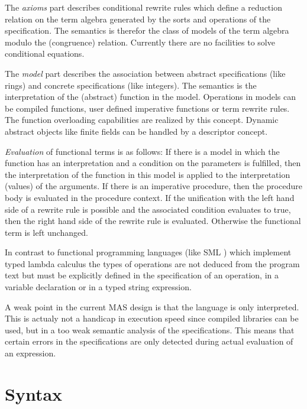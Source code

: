The {\em axioms} part describes conditional rewrite rules  
which define a reduction relation on the term algebra generated 
by the sorts and operations of the specification. 
The semantics is therefor the class of models of the 
term algebra modulo the (congruence) relation.   
Currently there are no facilities to solve conditional equations.

The {\em model} part describes the association between 
abstract specifications (like rings) and 
concrete specifications (like integers). 
The semantics is the interpretation of the (abstract) function 
in the model. Operations in models can be compiled functions, 
user defined imperative functions or term rewrite rules. 
The function overloading capabilities are realized by this concept.
Dynamic abstract objects like finite fields can be handled 
by a descriptor concept.

{\em Evaluation} of functional terms is as follows: 
If there is a model in which the function has an interpretation
and a condition on the parameters is fulfilled,
then the interpretation of the function in this model is applied 
to the interpretation (values) of the arguments.   
If there is an imperative procedure, then the procedure body 
is evaluated in the procedure context.
If the unification with the left hand side of a rewrite rule 
is possible and the associated condition evaluates to true, then 
the right hand side of the rewrite rule is evaluated.  
Otherwise the functional term is left unchanged.

In contrast to functional programming languages 
(like SML \cite{Appel 88}) which implement 
typed lambda calculus the types of 
operations are not deduced from the program text 
but must be explicitly defined in the specification 
of an operation, in a variable declaration 
or in a typed string expression.

A weak point in the current MAS design is that the language 
is only interpreted. This is actualy not a handicap 
in execution speed since compiled libraries can be used, 
but in a too weak semantic analysis of the specifications.
This means that certain errors in the specifications are 
only detected during actual evaluation of an expression.    


\section{Syntax}

